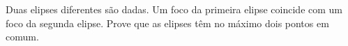 Duas elipses diferentes são dadas. Um foco da primeira elipse coincide com um foco da segunda elipse. Prove que as elipses têm no máximo dois pontos em comum.